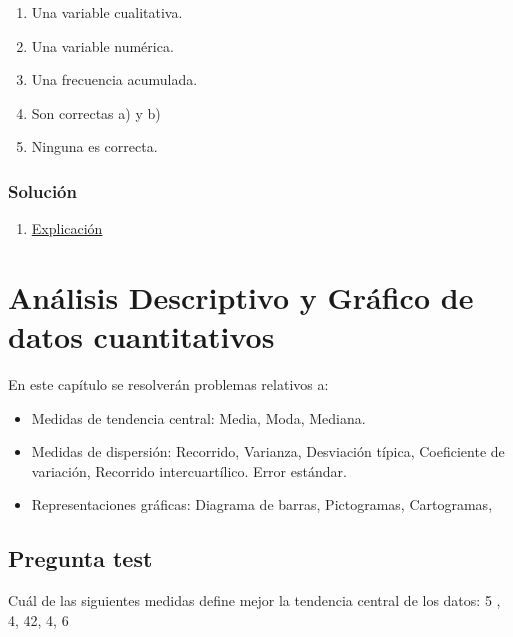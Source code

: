 \documentclass[
]{book}
\providecommand{\tightlist}{%
  \setlength{\itemsep}{0pt}\setlength{\parskip}{0pt}}
\begin{document}
\begin{enumerate}
\def\labelenumi{\alph{enumi})}
\tightlist
\item
  Una variable cualitativa.
\item
  Una variable numérica.
\item
  Una frecuencia acumulada.
\item
  Son correctas a) y b)
\item
  Ninguna es correcta.
\end{enumerate}

\hypertarget{soluciuxf3n-18}{%
\subsection{Solución}\label{soluciuxf3n-18}}

\begin{enumerate}
\def\labelenumi{\alph{enumi})}
\setcounter{enumi}{2}
\tightlist
\item
  \href{https://1fjmanzano.github.io/bioestadistica/tablas-de-frecuencias.html}{Explicación}
\end{enumerate}

\hypertarget{anuxe1lisis-descriptivo-y-gruxe1fico-de-datos-cuantitativos}{%
\chapter{Análisis Descriptivo y Gráfico de datos cuantitativos}\label{anuxe1lisis-descriptivo-y-gruxe1fico-de-datos-cuantitativos}}

En este capítulo se resolverán problemas relativos a:

\begin{itemize}
\tightlist
\item
  Medidas de tendencia central: Media, Moda, Mediana.
\item
  Medidas de dispersión: Recorrido, Varianza, Desviación típica, Coeficiente de variación, Recorrido intercuartílico. Error estándar.
\item
  Representaciones gráficas: Diagrama de barras, Pictogramas, Cartogramas,
\end{itemize}

\hypertarget{pregunta-test-17}{%
\section{Pregunta test}\label{pregunta-test-17}}

Cuál de las siguientes medidas define mejor la tendencia central de los datos: 5 , 4, 42, 4, 6
\end{document}
